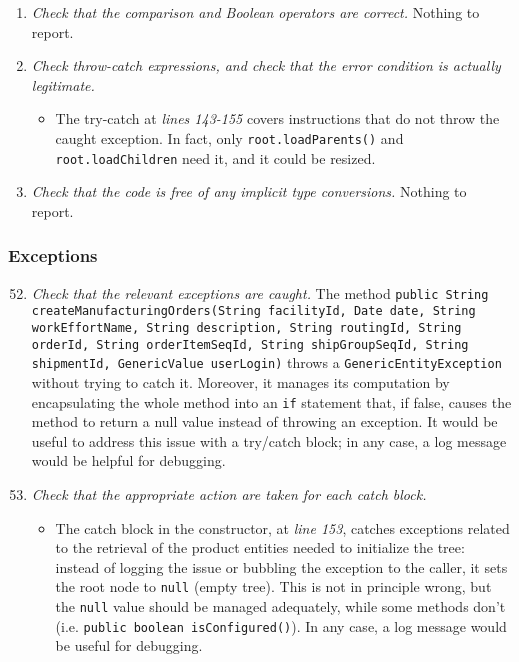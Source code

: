 \begin{enumerate}
			\item \textit{Check that the comparison and Boolean operators are correct.}\newline
			Nothing to report. %

			\item \textit{Check throw-catch expressions, and check that the error condition is actually legitimate.}
			\begin{itemize}
				\item The try-catch at \textit{lines 143-155} covers instructions that do not throw the caught exception. In fact, only \texttt{root.loadParents()} and \texttt{root.loadChildren} need it, and it could be resized.
			\end{itemize}

			\item \textit{Check that the code is free of any implicit type conversions.}\newline
			Nothing to report. %
		\end{enumerate}

	\subsubsection{Exceptions}
		\begin{enumerate}
			\setcounter{enumi}{51}
			\item \textit{Check that the relevant exceptions are caught.}\newline
			The method \texttt{public String createManufacturingOrders(String facilityId, Date date, String workEffortName, String description, String routingId, String orderId, String orderItemSeqId, String shipGroupSeqId, String shipmentId, GenericValue userLogin)} throws a \texttt{GenericEntityException} without trying to catch it. Moreover, it manages its computation by encapsulating the whole method into an \texttt{if} statement that, if false, causes the method to return a null value instead of throwing an exception. It would be useful to address this issue with a try/catch block; in any case, a log message would be helpful for debugging. %

			\item \textit{Check that the appropriate action are taken for each catch block.}
			\begin{itemize}
				\item The catch block in the constructor, at \textit{line 153}, catches exceptions related to the retrieval of the product entities needed to initialize the tree: instead of logging the issue or bubbling the exception to the caller, it sets the root node to \texttt{null} (empty tree). This is not in principle wrong, but the \texttt{null} value should be managed adequately, while some methods don't (i.e. \texttt{public boolean isConfigured()}). In any case, a log message would be useful for debugging.
			\end{itemize}
		\end{enumerate}

